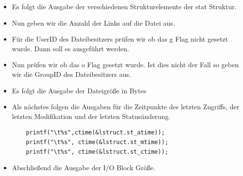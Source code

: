 \begin{itemize}
\begin{lstlisting}
printf( (lstruct.st_mode & S_IRUSR) ? "r" : "-");
printf( (lstruct.st_mode & S_IWUSR) ? "w" : "-");
printf( (lstruct.st_mode & S_IXUSR) ? "x" : "-");
printf( (lstruct.st_mode & S_IRGRP) ? "r" : "-");
printf( (lstruct.st_mode & S_IWGRP) ? "w" : "-");
printf( (lstruct.st_mode & S_IXGRP) ? "x" : "-");
printf( (lstruct.st_mode & S_IROTH) ? "r" : "-");
printf( (lstruct.st_mode & S_IWOTH) ? "w" : "-");
printf( (lstruct.st_mode & S_IXOTH) ? "x\t" : "-\t");
\end{lstlisting}

\item Es folgt die Ausgabe der verschiedenen Strukturelemente der stat
Struktur.
\item Nun geben wir die Anzahl der Links auf die Datei aus.
\newline
{}
\newline
\item Für die UserID des Dateibesitzers prüfen wir ob das g Flag nicht
gesetzt wurde. Dann soll es ausgeführt werden.
\newline
{}
\newline
\item Nun prüfen wir ob das o Flag gesetzt wurde. Ist dies nicht
der Fall so geben wir die GroupID des Dateibesitzers aus.
\newline
{}
\newline

\item Es folgt die Ausgabe der Dateigröße in Bytes
\newline
{}
\newline

\item Als nächstes folgen die Ausgaben für die Zeitpunkte des letzten Zugriffs,
der letzten Modifikation und der letzten Statusänderung.

\begin{lstlisting}
	printf("\t%s",ctime(&lstruct.st_atime));
	printf("\t%s", ctime(&lstruct.st_mtime));
	printf("\t%s", ctime(&lstruct.st_ctime));
\end{lstlisting}

\item Abschließend die Ausgabe der I/O Block Größe.
\newline
{}
\newline



\end{itemize}
